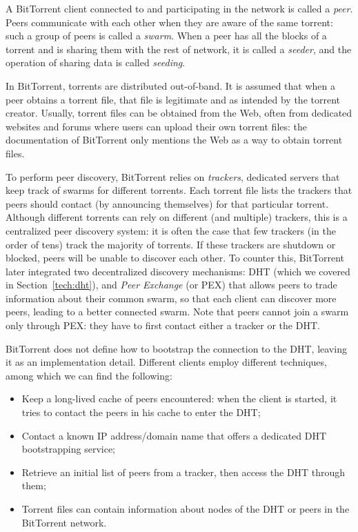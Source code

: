 \documentclass[mscthesis]{usiinfthesis}
\begin{document}
A BitTorrent client connected to and participating in the network is called a \emph{peer}. Peers communicate with each other when they are aware of the same torrent: such a group of peers is called a \emph{swarm}. When a peer has all the blocks of a torrent and is sharing them with the rest of network, it is called a \emph{seeder}, and the operation of sharing data is called \textit{seeding}.

In BitTorrent, torrents are distributed out-of-band. It is assumed that when a peer obtains a torrent file, that file is legitimate and as intended by the torrent creator. Usually, torrent files can be obtained from the Web, often from dedicated websites and forums where users can upload their own torrent files: the documentation of BitTorrent only mentions the Web as a way to obtain torrent files.

To perform peer discovery, BitTorrent relies on \emph{trackers}, dedicated servers that keep track of swarms for different torrents. Each torrent file lists the trackers that peers should contact (by announcing themselves) for that particular torrent. Although different torrents can rely on different (and multiple) trackers, this is a centralized peer discovery system: it is often the case that few trackers (in the order of tens) track the majority of torrents. If these trackers are shutdown or blocked, peers will be unable to discover each other. To counter this, BitTorrent later integrated two decentralized discovery mechanisms: DHT (which we covered in Section~\ref{tech:dht}), and \emph{Peer Exchange} (or PEX) that allows peers to trade information about their common swarm, so that each client can discover more peers, leading to a better connected swarm. Note that peers cannot join a swarm only through PEX: they have to first contact either a tracker or the DHT.

BitTorrent does not define how to bootstrap the connection to the DHT, leaving it as an implementation detail. Different clients employ different techniques, among which we can find the following:
\begin{itemize}
	\item Keep a long-lived cache of peers encountered: when the client is started, it tries to contact the peers in his cache to enter the DHT;
	\item Contact a known IP address/domain name that offers a dedicated DHT bootstrapping service;
	\item Retrieve an initial list of peers from a tracker, then access the DHT through them;
	\item Torrent files can contain information about nodes of the DHT or peers in the BitTorrent network.
\end{itemize}
\end{document}

